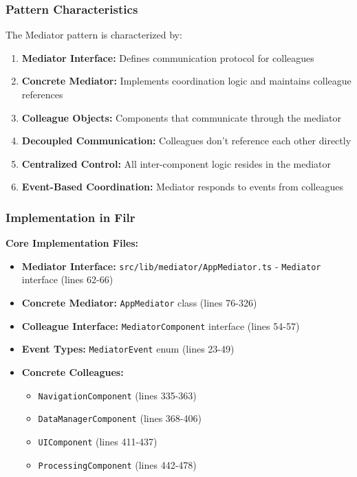 \documentclass[11pt]{article}
\begin{document}
\subsubsection{Pattern Characteristics}
The Mediator pattern is characterized by:

\begin{enumerate}[noitemsep]
    \item \textbf{Mediator Interface:} Defines communication protocol for colleagues
    \item \textbf{Concrete Mediator:} Implements coordination logic and maintains colleague references
    \item \textbf{Colleague Objects:} Components that communicate through the mediator
    \item \textbf{Decoupled Communication:} Colleagues don't reference each other directly
    \item \textbf{Centralized Control:} All inter-component logic resides in the mediator
    \item \textbf{Event-Based Coordination:} Mediator responds to events from colleagues
\end{enumerate}

\subsubsection{Implementation in Filr}

\textbf{Core Implementation Files:}
\begin{itemize}[noitemsep]
    \item \textbf{Mediator Interface:} \texttt{src/lib/mediator/AppMediator.ts} - \texttt{Mediator} interface (lines 62-66)
    \item \textbf{Concrete Mediator:} \texttt{AppMediator} class (lines 76-326)
    \item \textbf{Colleague Interface:} \texttt{MediatorComponent} interface (lines 54-57)
    \item \textbf{Event Types:} \texttt{MediatorEvent} enum (lines 23-49)
    \item \textbf{Concrete Colleagues:}
    \begin{itemize}[noitemsep]
        \item \texttt{NavigationComponent} (lines 335-363)
        \item \texttt{DataManagerComponent} (lines 368-406)
        \item \texttt{UIComponent} (lines 411-437)
        \item \texttt{ProcessingComponent} (lines 442-478)
    \end{itemize}
\end{itemize}
\end{document}
